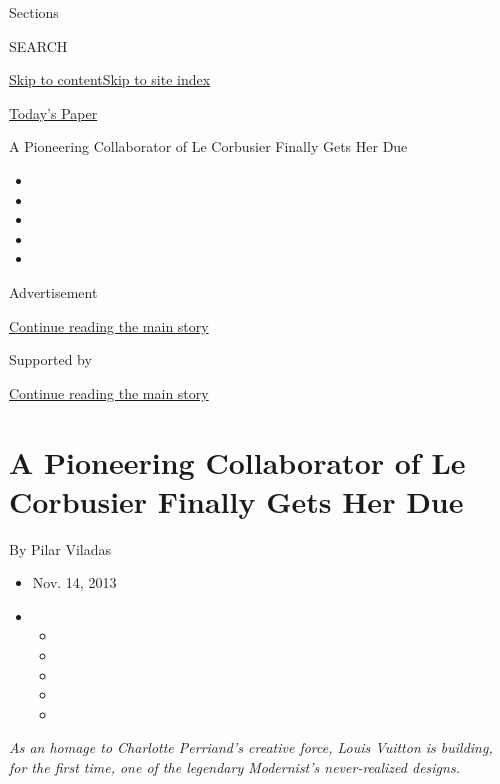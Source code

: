 Sections

SEARCH

\protect\hyperlink{site-content}{Skip to
content}\protect\hyperlink{site-index}{Skip to site index}

\href{https://myaccount.nytimes3xbfgragh.onion/auth/login?response_type=cookie\&client_id=vi}{}

\href{https://www.nytimes3xbfgragh.onion/section/todayspaper}{Today's
Paper}

A Pioneering Collaborator of Le Corbusier Finally Gets Her Due

\begin{itemize}
\item
\item
\item
\item
\item
\end{itemize}

Advertisement

\protect\hyperlink{after-top}{Continue reading the main story}

Supported by

\protect\hyperlink{after-sponsor}{Continue reading the main story}

\hypertarget{a-pioneering-collaborator-of-le-corbusier-finally-gets-her-due}{%
\section{A Pioneering Collaborator of Le Corbusier Finally Gets Her
Due}\label{a-pioneering-collaborator-of-le-corbusier-finally-gets-her-due}}

By Pilar Viladas

\begin{itemize}
\item
  Nov. 14, 2013
\item
  \begin{itemize}
  \item
  \item
  \item
  \item
  \item
  \end{itemize}
\end{itemize}

\emph{As an homage to Charlotte Perriand's creative force, Louis Vuitton
is building, for the first time, one of the legendary Modernist's
never-realized designs.}

